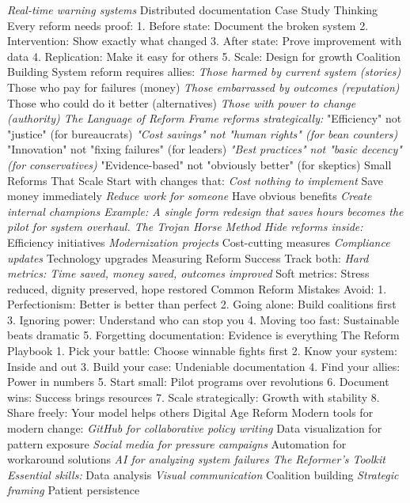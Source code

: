 \documentclass[12pt]{book}
\begin{document}
\textit{ Real-time warning systems
} Distributed documentation
Case Study Thinking
Every reform needs proof:
1. Before state: Document the broken system
2. Intervention: Show exactly what changed
3. After state: Prove improvement with data
4. Replication: Make it easy for others
5. Scale: Design for growth
Coalition Building
System reform requires allies:
\textit{ Those harmed by current system (stories)
} Those who pay for failures (money)
\textit{ Those embarrassed by outcomes (reputation)
} Those who could do it better (alternatives)
\textit{ Those with power to change (authority)
The Language of Reform
Frame reforms strategically:
} "Efficiency" not "justice" (for bureaucrats)
\textit{ "Cost savings" not "human rights" (for bean counters)
} "Innovation" not "fixing failures" (for leaders)
\textit{ "Best practices" not "basic decency" (for conservatives)
} "Evidence-based" not "obviously better" (for skeptics)
Small Reforms That Scale
Start with changes that:
\textit{ Cost nothing to implement
} Save money immediately
\textit{ Reduce work for someone
} Have obvious benefits
\textit{ Create internal champions
Example: A single form redesign that saves hours becomes the pilot for system overhaul.
The Trojan Horse Method
Hide reforms inside:
} Efficiency initiatives
\textit{ Modernization projects
} Cost-cutting measures
\textit{ Compliance updates
} Technology upgrades
Measuring Reform Success
Track both:
\textit{ Hard metrics: Time saved, money saved, outcomes improved
} Soft metrics: Stress reduced, dignity preserved, hope restored
Common Reform Mistakes
Avoid:
1. Perfectionism: Better is better than perfect
2. Going alone: Build coalitions first
3. Ignoring power: Understand who can stop you
4. Moving too fast: Sustainable beats dramatic
5. Forgetting documentation: Evidence is everything
The Reform Playbook
1. Pick your battle: Choose winnable fights first
2. Know your system: Inside and out
3. Build your case: Undeniable documentation
4. Find your allies: Power in numbers
5. Start small: Pilot programs over revolutions
6. Document wins: Success brings resources
7. Scale strategically: Growth with stability
8. Share freely: Your model helps others
Digital Age Reform
Modern tools for modern change:
\textit{ GitHub for collaborative policy writing
} Data visualization for pattern exposure
\textit{ Social media for pressure campaigns
} Automation for workaround solutions
\textit{ AI for analyzing system failures
The Reformer's Toolkit
Essential skills:
} Data analysis
\textit{ Visual communication
} Coalition building
\textit{ Strategic framing
} Patient persistence
\end{document}
